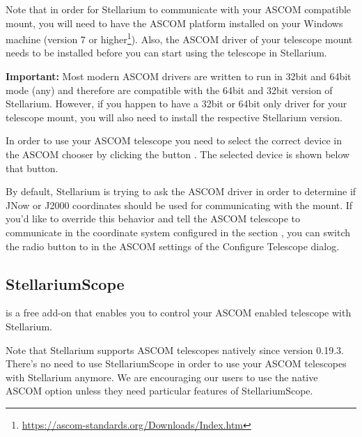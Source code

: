 Note that in order for Stellarium to communicate with your ASCOM
compatible mount, you will need to have the ASCOM platform installed
on your Windows machine (version 7 or
higher\footnote{\url{https://ascom-standards.org/Downloads/Index.htm}}). Also,
the ASCOM driver of your telescope mount needs to be installed before
you can start using the telescope in Stellarium.

\textbf{Important:} Most modern ASCOM drivers are written to run in 32bit and 64bit mode (any) and therefore are 
compatible with the 64bit and 32bit version of Stellarium. However, if you happen to have a 32bit or 64bit only
driver for your telescope mount, you will also need to install the respective Stellarium version.

In order to use your ASCOM telescope you need to select the correct device in the ASCOM chooser by clicking
the button . The selected device is shown below that button.

By default, Stellarium is trying to ask the ASCOM driver in order to determine if JNow or J2000 coordinates 
should be used for communicating with the mount. If you'd like to override this behavior and tell the ASCOM telescope
to communicate in the coordinate system configured in the section , you can
switch the radio button  to  in the ASCOM settings of 
the Configure Telescope dialog.

\subsection{StellariumScope}
\label{sec:plugins:StellariumScope}
 is a free add-on that enables you to control your ASCOM enabled telescope with Stellarium. 

Note that Stellarium supports ASCOM telescopes natively since version 0.19.3. There's no need to 
  use StellariumScope in order to use your ASCOM telescopes with Stellarium anymore. We are 
  encouraging our users to use the native ASCOM option unless they need particular features of StellariumScope.



